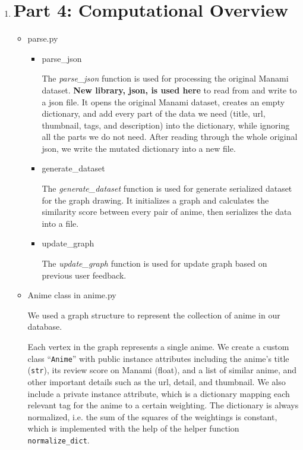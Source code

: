\documentclass[12pt]{article}
\begin{document}
\begin{enumerate}
\begin{itemize}
\end{itemize}
\newpage

\item \section*{Part 4: Computational Overview}

\begin{text}

\begin{itemize}
    \item parse.py
    \begin{itemize}
        \item parse\_json
        
            The \emph{parse\_json} function is used for processing the original Manami dataset. \textbf{New library, json, is used here} to read from and write to a json file. It opens the original Manami dataset, creates an empty dictionary, and add every part of the data we need (title, url, thumbnail, tags, and description) into the dictionary, while ignoring all the parts we do not need. After reading through the whole original json, we write the mutated dictionary into a new file.
            
        \item generate\_dataset
        
            The \emph{generate\_dataset} function is used for generate serialized dataset for the graph drawing. It initializes a graph and calculates the similarity score between every pair of anime, then serializes the data into a file.
            
        
        \item update\_graph
        
            The \emph{update\_graph} function is used for update graph based on previous user feedback.

    \end{itemize}

    
    \item Anime class in anime.py
    
    We used a graph structure to represent the collection of anime in our database. 
    
    Each vertex in the graph represents a single anime. We create a custom class “\texttt{Anime}” with public instance attributes including the anime's title (\texttt{str}), its review score on Manami (float), and a list of similar anime, and other important details such as the url, detail, and thumbnail. We also include a private instance attribute, which is a dictionary mapping each relevant tag for the anime to a certain weighting. The dictionary is always normalized, i.e. the sum of the squares of the weightings is constant, which is implemented with the help of the helper function \texttt{normalize\_dict}. 
    

\end{itemize}
\end{text}
\end{enumerate}
\end{document}
